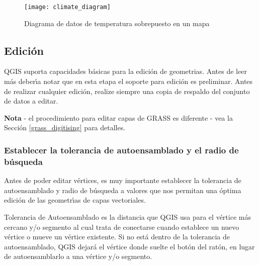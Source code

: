 \begin{figure}[ht]
   \begin{center}
   \caption{Diagrama de datos de temperatura sobrepuesto en un mapa \nixcaption}\label{fig:climatediagram}\smallskip
   \texttt{[image: climate\_diagram]}
\end{center}
\end{figure}

\subsection{Edici\'on}

QGIS suporta capacidades b\'asicas para la edici\'on de geometrias.  Antes de leer más
deber\'{\i}a notar que en esta etapa el soporte para edici\'on es preliminar.
Antes de realizar cualquier edici\'on, realize siempre una copia de respaldo del conjunto de datos
a editar. 

\textbf{Nota} - el procedimiento para editar capas de GRASS es diferente - vea la
Secci\'on \ref{grass_digitising} para detalles.

\subsubsection{Establecer la tolerancia de autoensamblado y el radio de b\'usqueda}

Antes de poder editar v\'ertices, es muy importante establecer la tolerancia
de autoensamblado y radio de b\'usqueda a valores que nos permitan una \'optima edici\'on de
las geometr\'{\i}as de capas vectoriales. 


Tolerancia de Autoensamblado es la distancia que QGIS usa para  el v\'ertice
más cercano y/o segmento al cual trata de conectarse
cuando establece un nuevo v\'ertice o mueve un v\'ertice existente. Si no est\'a dentro
de la tolerancia de autoensamblado, QGIS dejar\'a el v\'ertice donde suelte el
bot\'on del rat\'on, en lugar de autoensamblarlo a una v\'ertice y/o segmento. 

